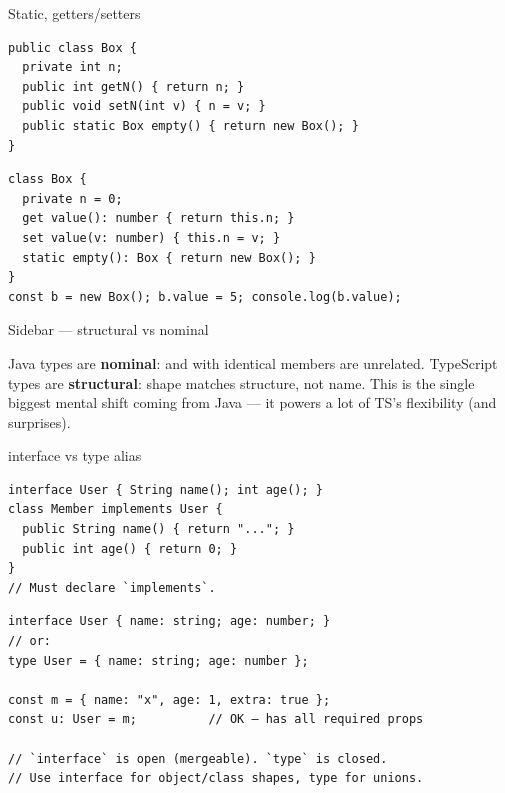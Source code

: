\documentclass[10pt]{article}
\begin{document}
\begin{construct}{Static, getters/setters}
\noindent
\begin{minipage}[t]{0.485\linewidth}
\begin{lstlisting}[style=java, title=Java]
public class Box {
  private int n;
  public int getN() { return n; }
  public void setN(int v) { n = v; }
  public static Box empty() { return new Box(); }
}
\end{lstlisting}
\end{minipage}\hfill
\begin{minipage}[t]{0.485\linewidth}
\begin{lstlisting}[style=ts, title=TypeScript]
class Box {
  private n = 0;
  get value(): number { return this.n; }
  set value(v: number) { this.n = v; }
  static empty(): Box { return new Box(); }
}
const b = new Box(); b.value = 5; console.log(b.value);
\end{lstlisting}
\end{minipage}
\end{construct}


\begin{construct}{Sidebar --- structural vs nominal}
\noindent
\begin{minipage}[t]{\linewidth}
\small Java types are \textbf{nominal}:  and  with
identical members are unrelated. TypeScript types are \textbf{structural}: shape
matches structure, not name. This is the single biggest mental shift coming from
Java --- it powers a lot of TS's flexibility (and surprises).
\end{minipage}
\end{construct}

\begin{construct}{interface vs type alias}
\noindent
\begin{minipage}[t]{0.485\linewidth}
\begin{lstlisting}[style=java, title=Java]
interface User { String name(); int age(); }
class Member implements User {
  public String name() { return "..."; }
  public int age() { return 0; }
}
// Must declare `implements`.
\end{lstlisting}
\end{minipage}\hfill
\begin{minipage}[t]{0.485\linewidth}
\begin{lstlisting}[style=ts, title=TypeScript]
interface User { name: string; age: number; }
// or:
type User = { name: string; age: number };

const m = { name: "x", age: 1, extra: true };
const u: User = m;          // OK — has all required props

// `interface` is open (mergeable). `type` is closed.
// Use interface for object/class shapes, type for unions.
\end{lstlisting}
\end{minipage}
\end{construct}
\end{document}
